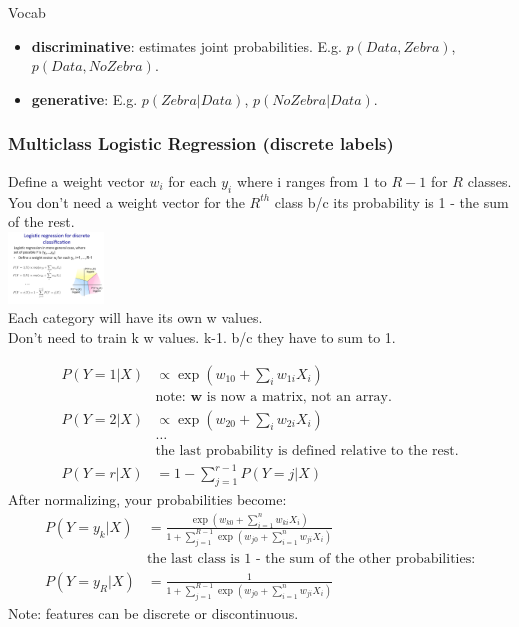 \hfill \\  \hfill \\


Vocab \hfill \\
\begin{itemize}
	\item \textbf{discriminative}:  estimates joint probabilities.  E.g. $p(Data, Zebra)$, $p(Data, No Zebra)$. 
	\item \textbf{generative}:  E.g. $p(Zebra | Data)$, $p(No Zebra | Data)$. 
\end{itemize}

\subsubsection{Multiclass Logistic Regression (discrete labels)}
Define a weight vector $w_i$ for each $y_i$ where i ranges from $1$ to $R-1$ for $R$ classes.
You don't need a weight vector for the $R^{th}$ class b/c its probability is 1 - the sum of the rest.  \hfill \\
\includegraphics[width=1in]{figures/multiclass_logistic.pdf} \hfill \\
Each category will have its own w values.  \hfill \\ %
Don't need to train k w values.  k-1.  b/c they have to sum to 1.    %

\begin {align*}
	P(Y=1 | X ) & \propto \exp(w_{10} + \sum_i w_{1i}X_i)  \\
		& \mbox{note: $\bm{w}$ is now a matrix, not an array.}  \\
	P(Y=2 | X ) & \propto \exp(w_{20} + \sum_i w_{2i}X_i)  \\
	 & \dots \\
	 & \mbox{the last probability is defined relative to the rest.}  \\
	P(Y=r | X ) &= 1- \sum_{j=1}^{r-1} P(Y=j | X)
\end{align*}
After normalizing, your probabilities become: 
\begin {align*}
	P(Y=y_k | X ) &=  \frac{\exp(w_{k0} + \sum_{i=1}^n w_{ki} X_i)}{1 + \sum_{j=1}^{R-1} \exp(w_{j0} + \sum_{i=1}^n w_{ji}X_i)} \\
	& \mbox{the last class is 1 - the sum of the other probabilities:} \\
	P(Y=y_R | X ) &=  \frac{1}{1 + \sum_{j=1}^{R-1} \exp(w_{j0} + \sum_{i=1}^n w_{ji}X_i)} 
\end{align*}
Note: features can be discrete or discontinuous. 


